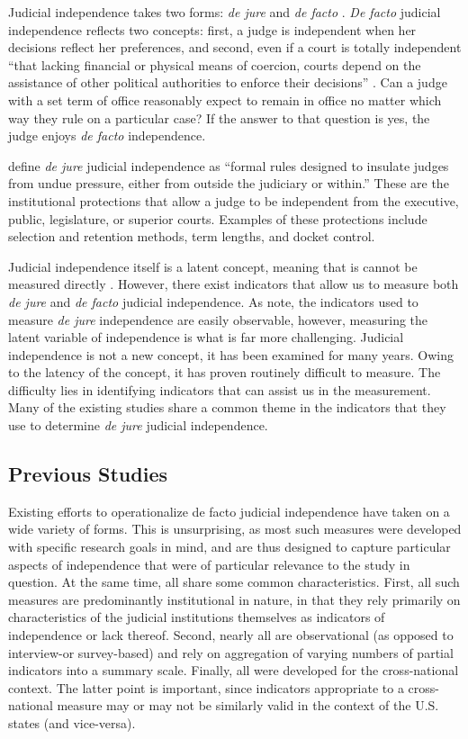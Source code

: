 \documentclass[12pt]{article}
\begin{document}
Judicial independence takes two forms: \textit{de jure} and \textit{de facto} \citep{Feld2003,Rios2014, Rosenberg1991,Voeten2008}.  \textit{De facto} judicial independence reflects two concepts: first, a judge is independent when her decisions reflect her preferences, and second, even if a court is totally independent ``that lacking financial or physical means of coercion, courts depend on the assistance of other political authorities to enforce their decisions'' \citep[4]{Rios2014}. Can a judge with a set term of office reasonably expect to remain in office no matter which way they rule on a particular case? If the answer to that question is yes, the judge enjoys \textit{de facto} independence. 

\citet[3]{Rios2014} define \textit{de jure} judicial independence as ``formal rules designed to insulate judges from undue pressure, either from outside the judiciary or within.''  These are the institutional protections that allow a judge to be independent from the executive, public, legislature, or superior courts.  Examples of these protections include selection and retention methods, term lengths, and docket control.

Judicial independence itself is a latent concept, meaning that is cannot be measured directly \citep[203]{Treier2008}.  However, there exist indicators that allow us to measure both \textit{de jure} and \textit{de facto} judicial independence.  As \citet[5]{Rios2014} note, the indicators used to measure \textit{de jure} independence are easily observable, however, measuring the latent variable of independence is what is far more challenging.  Judicial independence is not a new concept, it has been examined for many years.  Owing to the latency of the concept, it has proven routinely difficult to measure.  The difficulty lies in identifying indicators that can assist us in the measurement.  Many of the existing studies share a common theme in the indicators that they use to determine \textit{de jure} judicial independence.  

\subsection*{Previous Studies}%
Existing efforts to operationalize de facto judicial independence have taken on a wide variety of forms. This is unsurprising, as most such measures were developed with specific research goals in mind, and are thus designed to capture particular aspects of independence that were of particular relevance to the study in question. At the same time, all share some common characteristics. First, all such measures are predominantly institutional in nature, in that they rely primarily on characteristics of the judicial institutions themselves as indicators of independence or lack thereof. Second, nearly all are observational (as opposed to interview-or survey-based) and rely on aggregation of varying numbers of partial indicators into a 
summary scale. Finally, all were developed for the cross-national context. The latter point is important, since indicators appropriate to a cross-national measure may or may not be similarly valid in the context of the U.S. states (and vice-versa).
\end{document}
